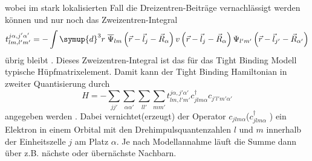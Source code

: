 wobei im stark lokalisierten Fall die Dreizentren-Beiträge vernachlässigt werden können und  
nur noch das Zweizentren-Integral 
\begin{equation*} 
    t^{j\alpha,j'\alpha'}_{lm,l'm'} = - \int \symup{d}^3r \; \overline{\Psi}_{lm} \left (\vec{r}-\vec{l}_j - \vec{R}_{\alpha} \right ) 
    v \left ( \vec{r} - \vec{l}_{j} - \vec{R}_{\alpha} \right ) \Psi_{l'm'} \left (\vec{r}-\vec{l}_{j'} - \vec{R}_{\alpha'} \right ) 
\end{equation*}
übrig bleibt \cite{SC_literature}.
Dieses Zweizentren-Integral ist das für das Tight Binding Modell typische Hüpfmatrixelement.
Damit kann der Tight Binding Hamiltonian in zweiter Quantisierung durch
\begin{equation}
    H = - \sum_{jj'} \sum_{\alpha \alpha'}\sum_{ll'} \sum_{mm'} t^{j\alpha,j'\alpha'}_{lm,l'm'}  c_{jlm\alpha}^\dagger c_{j'l'm'\alpha'}  \label{eqn:tight-binding-hamiltonian}
\end{equation}
angegeben werden \cite{anders-fkt}.
Dabei vernichtet(erzeugt) der Operator $c_{jlm\alpha}$($c_{jlm\alpha}^{\dagger}$ ) ein Elektron in einem Orbital mit den Drehimpulsquantenzahlen $l$ und $m$ innerhalb der Einheitszelle $j$
am Platz $\alpha$.
Je nach Modellannahme läuft die Summe dann über z.B. nächste oder übernächste Nachbarn.
